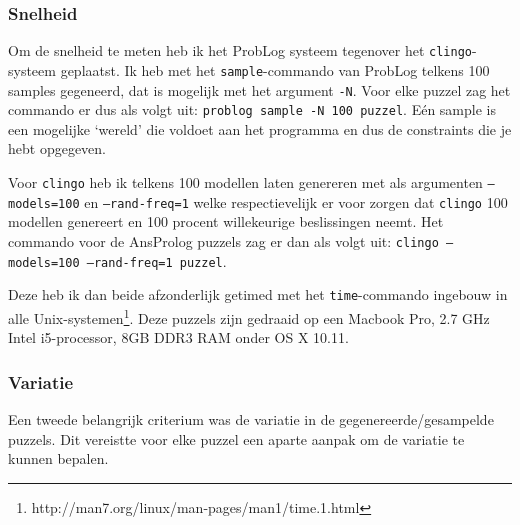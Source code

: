 \documentclass{article}
\begin{document}
\subsubsection*{Snelheid}
Om de snelheid te meten heb ik het ProbLog systeem tegenover het \texttt{clingo}-systeem geplaatst. Ik heb met het \texttt{sample}-commando van ProbLog telkens 100 samples gegeneerd, dat is mogelijk met het argument \texttt{-N}. Voor elke puzzel zag het commando er dus als volgt uit: \texttt{problog sample -N 100 puzzel}. E\'en sample is een mogelijke `wereld' die voldoet aan het programma en dus de constraints die je hebt opgegeven.

Voor \texttt{clingo} heb ik telkens 100 modellen laten genereren met als argumenten \texttt{--models=100} en \texttt{--rand-freq=1} welke respectievelijk er voor zorgen dat \texttt{clingo} 100 modellen genereert en 100 procent willekeurige beslissingen neemt. Het commando voor de AnsProlog puzzels zag er dan als volgt uit: \texttt{clingo --models=100 --rand-freq=1 puzzel}.

Deze heb ik dan beide afzonderlijk getimed met het \texttt{time}-commando ingebouw in alle Unix-systemen\footnote{http://man7.org/linux/man-pages/man1/time.1.html}. Deze puzzels zijn gedraaid op een Macbook Pro, 2.7 GHz Intel i5-processor, 8GB DDR3 RAM onder OS X 10.11.

\subsubsection*{Variatie}
Een tweede belangrijk criterium was de variatie in de gegenereerde/gesampelde puzzels. Dit vereistte voor elke puzzel een aparte aanpak om de variatie te kunnen bepalen.
\end{document}
